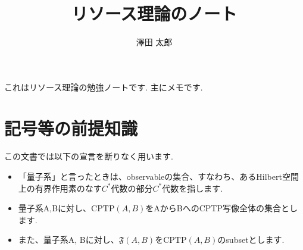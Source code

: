 \documentclass[uplatex, a4paper]{jsarticle}
\title{リソース理論のノート}
\author{澤田 太郎}
\begin{document}
\maketitle
これはリソース理論の勉強ノートです. 主にメモです.

\newpage
\section{記号等の前提知識}
この文書では以下の宣言を断りなく用います.
\begin{itemize}
  \item 「量子系」と言ったときは、observableの集合、すなわち、あるHilbert空間上の有界作用素のなす$C^*$代数の部分$C^*$代数を指します.
  \item 量子系A,Bに対し、$\mathrm{CPTP}(A,B)$をAからBへのCPTP写像全体の集合とします.
  \item また、量子系A, Bに対し、$\mathfrak{F}(A,B)$を$\mathrm{CPTP}(A,B)$のsubsetとします.
\end{itemize}

\newpage
\end{document}
